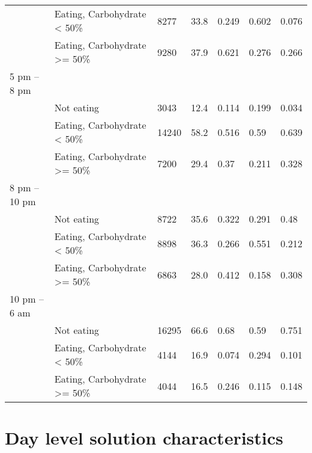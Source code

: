 \documentclass[11pt,a4paper]{article}
\begin{document}
\begin{table}
\begin{tabular}[t]{lllllll}
 & Eating, Carbohydrate < 50\% & 8277 & 33.8 & 0.249 & 0.602 & 0.076\\
 & Eating, Carbohydrate >= 50\% & 9280 & 37.9 & 0.621 & 0.276 & 0.266\\
5 pm – 8 pm &  &  &  &  &  & \\
 & Not eating & 3043 & 12.4 & 0.114 & 0.199 & 0.034\\
 & Eating, Carbohydrate < 50\% & 14240 & 58.2 & 0.516 & 0.59 & 0.639\\
 & Eating, Carbohydrate >= 50\% & 7200 & 29.4 & 0.37 & 0.211 & 0.328\\
8 pm – 10 pm &  &  &  &  &  & \\
 & Not eating & 8722 & 35.6 & 0.322 & 0.291 & 0.48\\
 & Eating, Carbohydrate < 50\% & 8898 & 36.3 & 0.266 & 0.551 & 0.212\\
 & Eating, Carbohydrate >= 50\% & 6863 & 28.0 & 0.412 & 0.158 & 0.308\\
10 pm – 6 am &  &  &  &  &  & \\
 & Not eating & 16295 & 66.6 & 0.68 & 0.59 & 0.751\\
 & Eating, Carbohydrate < 50\% & 4144 & 16.9 & 0.074 & 0.294 & 0.101\\
 & Eating, Carbohydrate >= 50\% & 4044 & 16.5 & 0.246 & 0.115 & 0.148\\
\bottomrule
\end{tabular}
\end{table}


\section{Day level solution
characteristics}\label{day-level-solution-characteristics}

\end{document}

